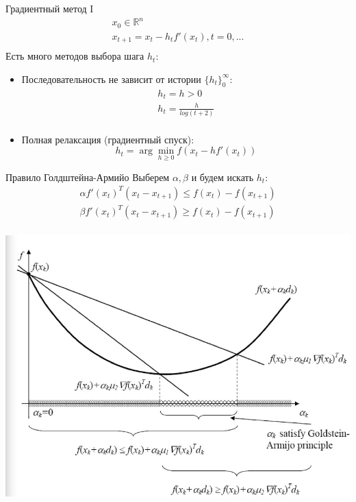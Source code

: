 \documentclass[14pt, fleqn, xcolor={dvipsnames, table}]{beamer}
\begin{document}
\begin{frame}{Градиентный метод I}
$$\begin{array}{l}
x_0 \in \mathbb{R}^n \\
x_{t+1} = x_t - h_t f'(x_t), t= 0,... \\
\end{array}$$
Есть много методов выбора шага $h_t$:
\begin{itemize}
  \item Последовательность не зависит от истории $\{h_t\}_{0}^{\infty}$:
  $$\begin{array}{l}
  h_t = h > 0 \\
  h_t = \frac{h}{log(t+2)} \\
  \end{array}$$
  \item Полная релаксация (градиентный спуск):
  $$
  h_t = \arg\min_{h \ge 0} f (x_t - h f'(x_t))
  $$
\end{itemize}
\end{frame}

\begin{frame}{Правило Голдштейна-Армийо}
Выберем $\alpha, \beta$ и будем искать $h_t$:%
\small
  $$\begin{array}{l}
  \alpha f'(x_{t})^T(x_t - x_{t+1}) \le f(x_{t}) - f(x_{t+1}) \\
  \beta f'(x_{t})^T(x_t - x_{t+1}) \ge f(x_{t}) - f(x_{t+1}) \\
  \end{array}$$
\begin{center}
\includegraphics[height=0.6\textheight]{GoldsteinArmijo.png}
\end{center}
\end{frame}
\end{document}

